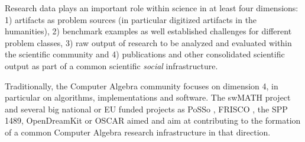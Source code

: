 \documentclass[a4paper,11pt]{article}
\begin{document}
Research data plays an important role within science in at least four
dimensions: 1) artifacts as problem sources (in particular digitized artifacts
in the humanities), 2) benchmark examples as well established challenges for
different problem classes, 3) raw output of research to be analyzed and
evaluated within the scientific community and 4) publications and other
consolidated scientific output as part of a common scientific \emph{social}
infrastructure.

Traditionally, the Computer Algebra community focuses on dimension 4, in
particular on algorithms, implementations and software.  The swMATH project
\cite{swmath} and several big national or EU funded projects as PoSSo
\cite{PoSSo}, FRISCO \cite{FRISCO}, the SPP 1489, OpenDreamKit \cite{odk} or
OSCAR \cite{oscar} aimed and aim at contributing to the formation of a common
Computer Algebra research infrastructure in that direction.
\end{document}
